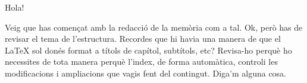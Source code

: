 Hola!

Veig que has començat amb la redacció de la memòria com a tal. Ok, però has de revisar el tema de l'estructura. Recordes que hi havia una manera de que el LaTeX sol donés format a títols de capítol, subtítols, etc?  Revisa-ho perquè ho necessites de tota manera perquè l'index, de forma automàtica, controli les modificacions i ampliacions que vagis fent del contingut.
Diga'm alguna cosa.